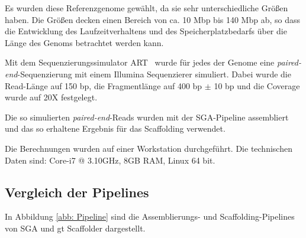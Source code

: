 \documentclass[a4paper,10pt,parskip]{scrartcl}
\begin{document}
Es wurden diese Referenzgenome gewählt, da sie sehr unterschiedliche
Größen haben. Die Größen decken einen Bereich von ca. 10 Mbp bis 140
Mbp ab, so dass die Entwicklung des Laufzeitverhaltens und des
Speicherplatzbedarfs über die Länge des Genoms betrachtet werden kann.

Mit dem Sequenzierungssimulator ART~\cite{Huang:2012kq} wurde für jedes
der Genome eine \textit{paired-end}-Sequenzierung mit einem Illumina
Sequenzierer simuliert. Dabei wurde die Read-Länge auf 150 bp, die
Fragmentlänge auf 400 bp $\pm$ 10 bp und die Coverage wurde auf 20X
festgelegt.

Die so simulierten \textit{paired-end}-Reads wurden mit der
SGA-Pipeline assembliert und das so erhaltene Ergebnis für das
Scaffolding verwendet.

Die Berechnungen wurden auf einer Workstation durchgeführt. Die
technischen Daten sind: Core-i7 @ 3.10GHz, 8GB RAM, Linux 64 bit.

\subsection{Vergleich der Pipelines}

In Abbildung \ref{abb: Pipeline} sind die Assemblierungs- und
Scaffolding-Pipelines von SGA und gt Scaffolder dargestellt.
\end{document}
